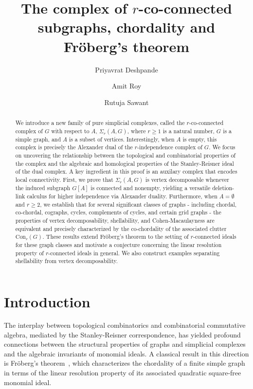 \documentclass[12pt,reqno]{amsart}
\title{The complex of $r$-co-connected subgraphs, chordality and Fr\"oberg's theorem}
\author{Priyavrat Deshpande}
\author{Amit Roy}
\author{Rutuja Sawant}
\theoremstyle{definition}
\begin{document}
	
	\begin{abstract}

We introduce a new family of pure simplicial complexes, called the $r$-co-connected complex of $G$ with respect to $A$, $\Sigma_r(A,G)$, where $r\geq 1$ is a natural number, $G$ is a simple graph, and $A$ is a subset of vertices.  
Interestingly, when $A$ is empty, this complex is precisely the Alexander dual of the $r$-independence complex of $G$. 
We focus on uncovering the relationship between the topological and combinatorial properties of the complex and the algebraic and homological properties of the Stanley-Reisner ideal of the dual complex. 
A key ingredient in this proof is an auxilary complex that encodes local connectivity. 
First, we prove that $\Sigma_r(A,G)$ is vertex decomposable whenever the induced subgraph $G[A]$ is connected and nonempty, yielding a versatile deletion-link calculus for higher independence via Alexander duality. 
Furthermore, when $A=\emptyset$ and $r \ge 2$, we establish that for several significant classes of graphs - including chordal, co-chordal, cographs, cycles, complements of cycles, and certain grid graphs - the properties of vertex decomposability, shellability, and Cohen-Macaulayness are equivalent and precisely characterized by the co-chordality of the associated clutter $\mathrm{Con}_r(G)$. These results extend Fr\"oberg's theorem to the setting of $r$-connected ideals for these graph classes and motivate a conjecture concerning the linear resolution property of $r$-connected ideals in general. We also construct examples separating shellability from vertex decomposability.
\end{abstract}

\maketitle
	
\section{Introduction}\label{introduction}



The interplay between topological combinatorics and combinatorial commutative algebra, mediated by the Stanley-Reisner correspondence, has yielded profound connections between the structural properties of graphs and simplicial complexes and the algebraic invariants of monomial ideals. A classical result in this direction is Fr\"oberg’s theorem~\cite{OSR}, which characterizes the chordality of a finite simple graph in terms of the linear resolution property of its associated quadratic square-free monomial ideal.
	
\end{document}
